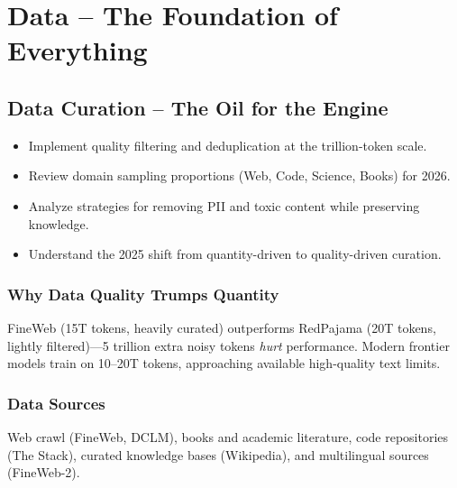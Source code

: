 \part{Data -- The Foundation of Everything}

\chapter{Data Curation -- The Oil for the Engine}
\minitoc

\begin{chapteroverview}
  \begin{itemize}
    \item Implement quality filtering and deduplication at the trillion-token scale.
    \item Review domain sampling proportions (Web, Code, Science, Books) for 2026.
    \item Analyze strategies for removing PII and toxic content while preserving knowledge.
    \item Understand the 2025 shift from quantity-driven to quality-driven curation.
  \end{itemize}
\end{chapteroverview}

\section{Why Data Quality Trumps Quantity}

FineWeb \parencite{penedo2024fineweb} (15T tokens, heavily curated) outperforms RedPajama (20T tokens, lightly filtered)---5 trillion extra noisy tokens \emph{hurt} performance. Modern frontier models train on 10--20T tokens, approaching available high-quality text limits.

\section{Data Sources}

Web crawl (FineWeb, DCLM), books and academic literature, code repositories (The Stack), curated knowledge bases (Wikipedia), and multilingual sources (FineWeb-2).

